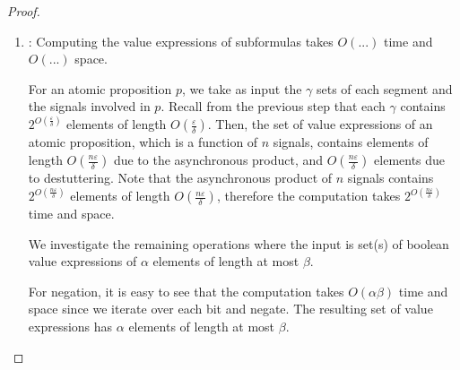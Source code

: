 \begin{proof}
\begin{enumerate}
		
		
		\item \TODO:
		Computing the value expressions of subformulas takes $O(...)$ time %
		and $O(...)$ space. %
		
		
		For an atomic proposition $p$, we take as input the $\gamma$ sets of each segment and the signals involved in $p$.
		Recall from the previous step that each $\gamma$ contains $2^{O(\frac{\varepsilon}{\delta})}$ elements of length $O(\frac{\varepsilon}{\delta})$.
		Then, the set of value expressions of an atomic proposition, which is a function of $n$ signals, contains elements of length $O(\frac{n\varepsilon}{\delta})$ due to the asynchronous product, and $O(\frac{n\varepsilon}{\delta})$ elements due to destuttering.
		Note that the asynchronous product of $n$ signals contains $2^{O(\frac{n\varepsilon}{\delta})}$ elements of length $O(\frac{n\varepsilon}{\delta})$, therefore the computation takes $2^{O(\frac{n\varepsilon}{\delta})}$ time and space. %
		
		We investigate the remaining operations where the input is set(s) of boolean value expressions of $\alpha$ elements of length at most $\beta$.
		
		For negation, it is easy to see that the computation takes $O(\alpha \beta)$ time and space since we iterate over each bit and negate.
		The resulting set of value expressions has $\alpha$ elements of length at most $\beta$.
		

\end{enumerate}
\end{proof}
